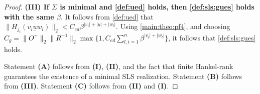 \documentclass[journal,twoside,web]{ieeecolor}
\begin{document}
\begin{proof}
\textbf{(III) If $\Sigma$ is minimal and \eqref{def:ued} holds, then \eqref{def:sls:gues} holds with the same $\beta$}. 
  It follows from \eqref{def:ued} that
  \( \|H_{j_i}(v_i\underline{u}w_l)\|_2 <  C_{ed}\beta^{|v_i|+|\underline{u}|+|w_l|} \).
  Using \eqref{main:theo:pf4}, 
  and choosing \textcolor{black}{$C_g=\|O^{+}\|_2\|R^{-1}\|_2\max\{1,C_{ed}\sum_{l,i=1}^{n} \beta^{|v_i|+|w_l|}\}$},  it follows that
  \eqref{def:sls:gues} holds. 

  Statement \textbf{(A)} follows from \textbf{(I)}, \textbf{(II)}, and the fact that finite Hankel-rank guarantees the existence of a minimal SLS realization. Statement \textbf{(B)} follows from \textbf{(III)}.  Statement \textbf{(C)} follows from \textbf{(II)} and \textbf{(I)}.
  \end{proof}
\end{document}
